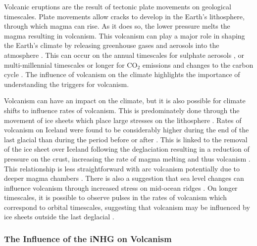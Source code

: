 Volcanic eruptions are the result of tectonic plate movements on geological timescales. Plate movements allow cracks to develop in the Earth’s lithosphere, through which magma can rise. As it does so, the lower pressure melts the magma resulting in volcanism. This volcanism can play a major role in shaping the Earth’s climate by releasing greenhouse gases and aerosols into the atmosphere \citep{hayTectonicsClimate1996, kenderPaleoceneEoceneCarbon2021}. This can occur on the annual timescales for sulphate aerosols \citep{zhuPersistingVolcanicAsh2020}, or multi-millennial timescales or longer for CO$_2$ emissions and changes to the carbon cycle \citep{siglTimingClimateForcing2015, lohmannIceCoreEvidence2022}. The influence of volcanism on the climate highlights the importance of understanding the triggers for volcanism. 

Volcanism can have an impact on the climate, but it is also possible for climate shifts to influence rates of volcanism. This is predominately done through the movement of ice sheets which place large stresses on the lithosphere \citep{nakadaIceAgeTrigger1992}. Rates of volcanism on Iceland were found to be considerably higher during the end of the last glacial than during the period before or after \citep{maclennanLinkVolcanismDeglaciation2002}. This is linked to the removal of the ice sheet over Iceland following the deglaciation resulting in a reduction of pressure on the crust, increasing the rate of magma melting and thus volcanism \citep{aubryImpactClimateChange2022}. This relationship is less straightforward with arc volcanism potentially due to deeper magma chambers \citep{wattVolcanicResponseDeglaciation2013}. There is also a suggestion that sea level changes can influence volcanism through increased stress on mid-ocean ridges \citep{boulahanisSeaLevelVariations2020}. On longer timescales, it is possible to observe pulses in the rates of volcanism which correspond to orbital timescales, suggesting that volcanism may be influenced by ice sheets outside the last deglacial \citep{schindlbeckMioceneHoloceneMarine2018}.

\subsubsection{The Influence of the iNHG on Volcanism}

